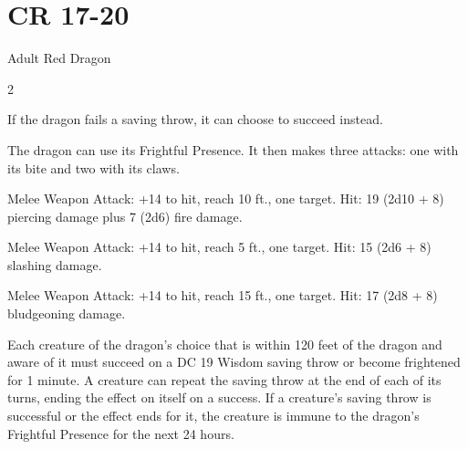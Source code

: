 \documentclass[letterpaper, 11pt, bg=full, twocolumn, stats=modern]{dndbook}
\begin{document}
\section{CR 17-20}

\vspace{0.5em}


\begin{DndMonster}[float*=tp,width=\textwidth + 8pt, toptitle=0pt, top=1pt]{Adult Red Dragon}
\vspace*{-1.8\baselineskip}
\begin{multicols}{2}
\raggedcolumns
\begingroup
\setlength{\premulticols}{0pt}
\setlength{\postmulticols}{0pt}
\setlength{\multicolsep}{0pt}
\setlength{\parskip}{0pt}
\noindent {}
\DndMonsterBasics[
    armor-class = {19 (natural armor)},
    hit-points = {256 (19d12 + 133)},
    speed = {40 ft., fly 80 ft., climb 40 ft.},
    initiative = +0
]
\DndMonsterAbilityScores[
    str = 27,
    dex = 10,
    con = 25,
    int = 16,
    wis = 13,
    cha = 21,
    dex save = +6,
    con save = +13,
    wis save = +7,
    cha save = +11
]

\DndMonsterDetails[
    skills = {Perception +13, Stealth +6},
    damage-immunities = {fire},
    senses = {blindsight 60 ft., darkvision 120 ft.},
    languages = {Common, Draconic},
    challenge = {17 (18,000 XP)}
]

If the dragon fails a saving throw, it can choose to succeed instead.

The dragon can use its Frightful Presence. It then makes three attacks: one with its bite and two with its claws.

Melee Weapon Attack: +14 to hit, reach 10 ft., one target. Hit: 19 (2d10 + 8) piercing damage plus 7 (2d6) fire damage.

Melee Weapon Attack: +14 to hit, reach 5 ft., one target. Hit: 15 (2d6 + 8) slashing damage.

Melee Weapon Attack: +14 to hit, reach 15 ft., one target. Hit: 17 (2d8 + 8) bludgeoning damage.

Each creature of the dragon's choice that is within 120 feet of the dragon and aware of it must succeed on a DC 19 Wisdom saving throw or become frightened for 1 minute. A creature can repeat the saving throw at the end of each of its turns, ending the effect on itself on a success. If a creature's saving throw is successful or the effect ends for it, the creature is immune to the dragon's Frightful Presence for the next 24 hours.


\end{multicols}
\end{DndMonster}
\end{document}

